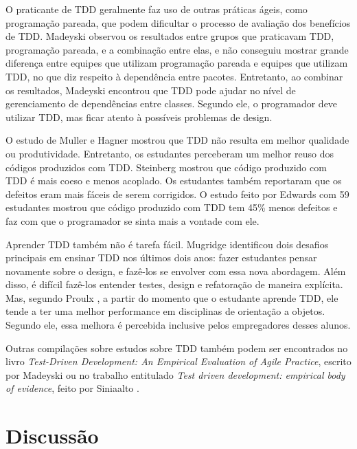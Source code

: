 O praticante de TDD geralmente faz uso de outras práticas ágeis, como
programação pareada, que podem dificultar o processo de avaliação dos benefícios
de TDD. Madeyski \cite{madeyski-package-dependencies} observou os resultados
entre grupos que praticavam TDD, programação pareada, e a combinação entre elas,
e não conseguiu mostrar grande diferença entre equipes que utilizam programação 
pareada e equipes que utilizam TDD, no que diz respeito à dependência entre 
pacotes. Entretanto, ao combinar os resultados, Madeyski encontrou que TDD pode 
ajudar no nível de gerenciamento de dependências entre classes. Segundo ele, o 
programador deve utilizar TDD, mas ficar atento à possíveis problemas de design.

O estudo de Muller e Hagner \cite{muller-e-hagner} mostrou que TDD não resulta
em melhor qualidade ou produtividade. Entretanto, os estudantes perceberam um 
melhor reuso dos códigos produzidos com TDD. Steinberg \cite{steinberg} mostrou
que código produzido com TDD é mais coeso e menos acoplado. Os estudantes também
reportaram que os defeitos eram mais fáceis de serem corrigidos. O estudo feito
por Edwards \cite{edwards} com 59 estudantes mostrou que código produzido com
TDD tem 45\% menos defeitos e faz com que o programador se sinta mais a vontade
com ele.

Aprender TDD também não é tarefa fácil. Mugridge \cite{mugridge} identificou
dois desafios principais em ensinar TDD nos últimos dois anos: fazer estudantes
pensar novamente sobre o design, e fazê-los se envolver com essa nova
abordagem. Além disso, é difícil fazê-los entender testes, design e refatoração
de maneira explícita. Mas, segundo Proulx \cite{proulx}, a partir do momento que
o estudante aprende TDD, ele tende a ter uma melhor performance em disciplinas
de orientação a objetos. Segundo ele, essa melhora é percebida inclusive pelos
empregadores desses alunos. 

Outras compilações sobre estudos sobre TDD também podem ser encontrados no livro
\textit{Test-Driven Development: An Empirical Evaluation of Agile Practice},
escrito por Madeyski \cite{madeyski-livro} ou no trabalho entitulado
\textit{Test driven development: empirical body of evidence}, feito por
Siniaalto \cite{tdd-body-of-evidence}.

\section{Discussão}

